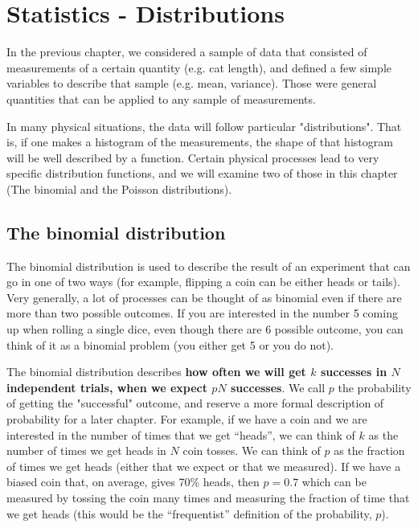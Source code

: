 
%
\chapter{Statistics - Distributions}
\label{chap:StatsDistributions}
In the previous chapter, we considered a sample of data that consisted of measurements of a certain quantity (e.g. cat length), and defined a few simple variables to describe that sample (e.g. mean, variance). Those were general quantities that can be applied to any sample of measurements.

In many physical situations, the data will follow particular "distributions". That is, if one makes a histogram of the measurements, the shape of that histogram will be well described by a function. Certain physical processes lead to very specific distribution functions, and we will examine two of those in this chapter (The binomial and the Poisson distributions).

\section{The binomial distribution}

The binomial distribution is used to describe the result of an experiment that can go in one of two ways (for example, flipping a coin can be either heads or tails). Very generally, a lot of processes can be thought of as binomial even if there are more than two possible outcomes. If you are interested in the number 5 coming up when rolling a single dice, even though there are 6 possible outcome, you can think of it as a binomial problem (you either get 5 or you do not).

The binomial distribution describes \textbf{how often we will get $k$ successes in $N$ independent trials, when we expect $pN$ successes}. We call $p$ the probability of getting the "successful" outcome, and reserve a more formal description of probability for a later chapter. For example, if we have a coin and we are interested in the number of times that we get ``heads'', we can think of $k$ as the number of times we get heads in $N$ coin tosses. We can think of $p$ as the fraction of times we get heads (either that we expect or that we measured). If we have a biased coin that, on average, gives 70\% heads, then $p=0.7$ which can be measured by tossing the coin many times and measuring the fraction of time that we get heads (this would be the ``frequentist'' definition of the probability, $p$). 


